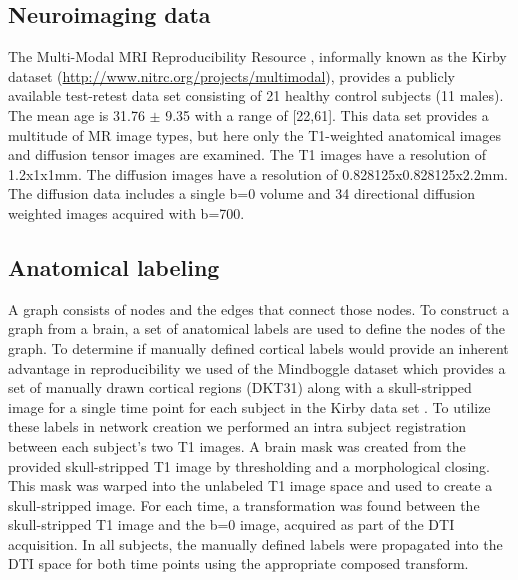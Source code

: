 \documentclass{frontiersSCNS} %
\begin{document}
\subsection{Neuroimaging data}
The Multi-Modal MRI Reproducibility Resource \citep{Landman2011},
informally known as the Kirby dataset (\url{http://www.nitrc.org/projects/multimodal}), 
provides a publicly available test-retest data set consisting of 21
healthy control subjects (11 males). The mean
age is 31.76 $\pm$ 9.35 with a range of [22,61]. This data set provides a
multitude of MR image types, but here only the T1-weighted anatomical images and diffusion
tensor images are examined. The T1 images have a resolution of
1.2x1x1mm. The diffusion images have a resolution of
0.828125x0.828125x2.2mm. The diffusion data includes a single b=0
volume and 34 directional diffusion weighted images acquired with b=700. 

\subsection{Anatomical labeling}
A graph consists of nodes and the edges that connect those nodes. To construct a graph from a brain, a set of anatomical labels
are used to define the nodes of the graph. To determine if manually defined cortical labels would provide an inherent advantage in
reproducibility we used of the Mindboggle dataset which provides a set of manually drawn cortical regions (DKT31) 
along with a skull-stripped image for a single time point for each subject in the Kirby data set \citep{Klein2012}. 
To utilize these labels in network creation we performed an intra subject registration between each subject's two T1 images. 
A brain mask was created from the provided skull-stripped T1 image by thresholding and a morphological closing. This mask
was warped into the unlabeled T1 image space and used to create a skull-stripped image. For each time, a transformation was found
between the skull-stripped T1 image and the b=0 image, acquired as part of the DTI acquisition. In all subjects, the manually defined
labels were propagated into the DTI space for both time points using the appropriate composed transform. 
\end{document}
